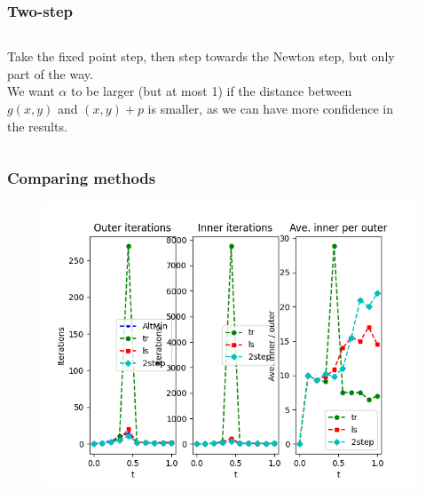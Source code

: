 \documentclass{beamer}
\begin{document}
\begin{frame}
\frametitle{Two-step}

\begin{columns}
	\begin{column}{0.5\textwidth}
		Take the fixed point step, then step towards the Newton step, but only part of the way.
		\\
		\vspace{1em}
		We want $\alpha$ to be larger (but at most 1) if the distance between $g(x,y)$ and $(x,y) + p$ is smaller, as we can have more confidence in the results.
	\end{column}
	\begin{column}{0.5\textwidth}
		\begin{figure}
		\end{figure}
	\end{column}
\end{columns}

\end{frame}

\begin{frame}
\frametitle{Comparing methods}

\begin{figure}
\includegraphics[width=\textwidth]{FIG_GD_its_full.png}
\end{figure}

\end{frame}
\end{document}
